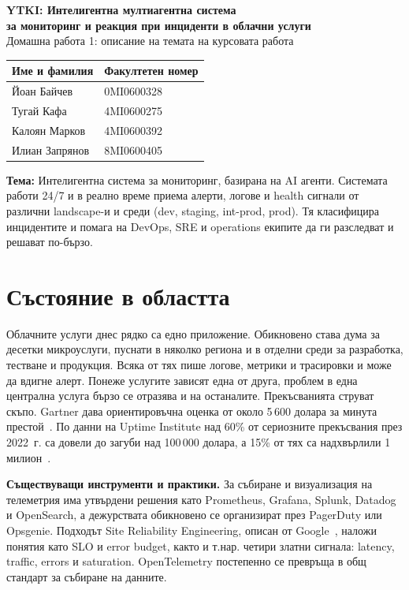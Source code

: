 \documentclass[11pt,a4paper]{article}
\begin{document}
\begin{center}
  {\Large\bfseries YTKI: Интелигентна мултиагентна система\\[2pt]
  за мониторинг и реакция при инциденти в облачни услуги}\\[6pt]
  {\normalsize Домашна работа 1: описание на темата на курсовата работа}
\end{center}

\begin{center}
\begin{tabular}{ll}
\toprule
\textbf{Име и фамилия} & \textbf{Факултетен номер} \\
\midrule
Йоан Байчев & 0MI0600328 \\
Тугай Кафа & 4MI0600275 \\
Калоян Марков & 4MI0600392 \\
Илиан Запрянов & 8MI0600405 \\
\bottomrule
\end{tabular}
\end{center}

\textbf{Тема:} Интелигентна система за мониторинг, базирана на AI агенти.
Системата работи 24/7 и в реално време приема алерти, логове и health сигнали
от различни landscape-и и среди (dev, staging, int-prod, prod). Тя класифицира
инцидентите и помага на DevOps, SRE и operations екипите да ги разследват и
решават по-бързо.

\section{Състояние в областта}

Облачните услуги днес рядко са едно приложение. Обикновено става дума за
десетки микроуслуги, пуснати в няколко региона и в отделни среди за
разработка, тестване и продукция. Всяка от тях пише логове, метрики и
трасировки и може да вдигне алерт. Понеже услугите зависят една от друга,
проблем в една централна услуга бързо се отразява и на останалите.
Прекъсванията струват скъпо. Gartner дава ориентировъчна оценка от около
5\,600 долара за минута престой~\cite{gartner}. По данни на Uptime Institute
над 60\% от сериозните прекъсвания през 2022~г. са довели до загуби над
100\,000 долара, а 15\% от тях са надхвърлили 1 милион~\cite{uptime}.

\textbf{Съществуващи инструменти и практики.} За събиране и визуализация на
телеметрия има утвърдени решения като Prometheus, Grafana, Splunk, Datadog и
OpenSearch, а дежурствата обикновено се организират през PagerDuty или
Opsgenie. Подходът Site Reliability Engineering, описан от Google~\cite{sre},
наложи понятия като SLO и error budget, както и т.нар. четири златни сигнала:
latency, traffic, errors и saturation. OpenTelemetry постепенно се превръща в
общ стандарт за събиране на данните.
\end{document}
